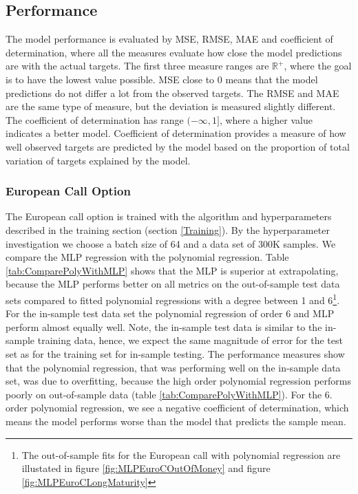 \subsection{Performance}
The model performance is evaluated by MSE, RMSE, MAE and coefficient of determination, where all the measures evaluate how close the model predictions are with the actual targets. The first three measure ranges are $\mathbb{R}^+$, where the goal is to have the lowest value possible. MSE close to 0 means that the model predictions do not differ a lot from the observed targets. The RMSE and MAE are the same type of measure, but the deviation is measured slightly different. The coefficient of determination has range $(-\infty, 1]$, where a higher value indicates a better model. Coefficient of determination provides a measure of how well observed targets are predicted by the model based on the proportion of total variation of targets explained by the model.

\subsubsection{European Call Option}
The European call option is trained with the algorithm and hyperparameters described in the training section (section \ref{Training}). By the hyperparameter investigation we choose a batch size of 64 and a data set of 300K samples. We compare the MLP regression with the polynomial regression. Table \ref{tab:ComparePolyWithMLP} shows that the MLP is superior at extrapolating, because the MLP performs better on all metrics on the out-of-sample test data sets compared to fitted polynomial regressions with a degree between 1 and 6\footnote{The out-of-sample fits for the European call with polynomial regression are illustated in figure \ref{fig:MLPEuroCOutOfMoney} and figure \ref{fig:MLPEuroCLongMaturity}}. For the in-sample test data set the polynomial regression of order 6 and MLP perform almost equally well. Note, the in-sample test data is similar to the in-sample training data, hence, we expect the same magnitude of error for the test set as for the training set for in-sample testing. The performance measures show that the polynomial regression, that was performing well on the in-sample data set, was due to overfitting, because the high order polynomial regression performs poorly on out-of-sample data (table \ref{tab:ComparePolyWithMLP}). For the 6. order polynomial regression, we see a negative coefficient of determination, which means the model performs worse than the model that predicts the sample mean. \\

